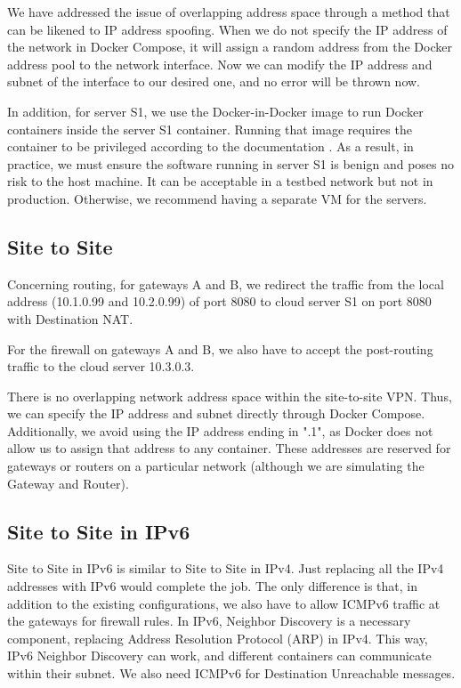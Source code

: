 \documentclass[article]{aaltoseries}
\begin{document}
We have addressed the issue of overlapping address space through a method that can be likened to IP address spoofing. When we do not specify the IP address of the network in Docker Compose, it will assign a random address from the Docker address pool to the network interface. Now we can modify the IP address and subnet of the interface to our desired one, and no error will be thrown now.

In addition, for server S1, we use the Docker-in-Docker image to run Docker containers inside the server S1 container. Running that image requires the container to be privileged according to the documentation \cite{Docker}. As a result, in practice, we must ensure the software running in server S1 is benign and poses no risk to the host machine. It can be acceptable in a testbed network but not in production. Otherwise, we recommend having a separate VM for the servers.

\subsection{Site to Site}

Concerning routing, for gateways A and B, we redirect the traffic from the local address (10.1.0.99 and 10.2.0.99) of port 8080 to cloud server S1 on port 8080 with Destination NAT.

For the firewall on gateways A and B, we also have to accept the post-routing traffic to the cloud server 10.3.0.3.

There is no overlapping network address space within the site-to-site VPN. Thus, we can specify the IP address and subnet directly through Docker Compose. Additionally, we avoid using the IP address ending in ".1", as Docker does not allow us to assign that address to any container. These addresses are reserved for gateways or routers on a particular network (although we are simulating the Gateway and Router).

\subsection{Site to Site in IPv6}

Site to Site in IPv6 is similar to Site to Site in IPv4. Just replacing all the IPv4 addresses with IPv6 would complete the job. The only difference is that, in addition to the existing configurations, we also have to allow ICMPv6 traffic at the gateways for firewall rules. In IPv6, Neighbor Discovery is a necessary component, replacing Address Resolution Protocol (ARP) in IPv4. This way, IPv6 Neighbor Discovery can work, and different containers can communicate within their subnet. We also need ICMPv6 for Destination Unreachable messages.
\end{document}
